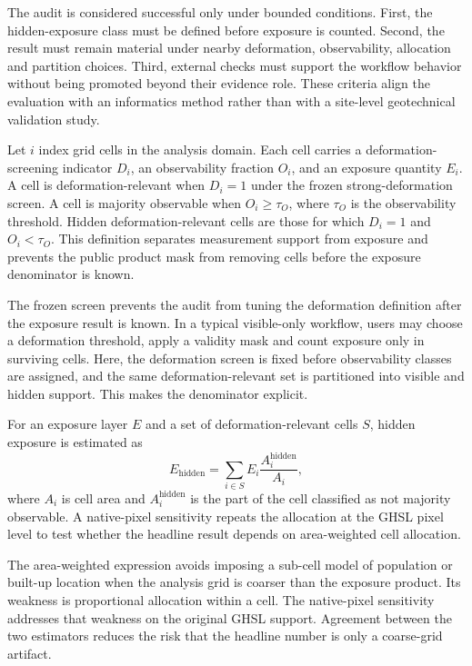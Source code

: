 \documentclass[pdflatex,sn-mathphys-ay]{sn-jnl}
\begin{document}
The audit is considered successful only under bounded conditions. First, the hidden-exposure class must be defined before exposure is counted. Second, the result must remain material under nearby deformation, observability, allocation and partition choices. Third, external checks must support the workflow behavior without being promoted beyond their evidence role. These criteria align the evaluation with an informatics method rather than with a site-level geotechnical validation study.

Let $i$ index grid cells in the analysis domain. Each cell carries a deformation-screening indicator $D_i$, an observability fraction $O_i$, and an exposure quantity $E_i$. A cell is deformation-relevant when $D_i=1$ under the frozen strong-deformation screen. A cell is majority observable when $O_i \geq \tau_O$, where $\tau_O$ is the observability threshold. Hidden deformation-relevant cells are those for which $D_i=1$ and $O_i<\tau_O$. This definition separates measurement support from exposure and prevents the public product mask from removing cells before the exposure denominator is known.

The frozen screen prevents the audit from tuning the deformation definition after the exposure result is known. In a typical visible-only workflow, users may choose a deformation threshold, apply a validity mask and count exposure only in surviving cells. Here, the deformation screen is fixed before observability classes are assigned, and the same deformation-relevant set is partitioned into visible and hidden support. This makes the denominator explicit.

For an exposure layer $E$ and a set of deformation-relevant cells $S$, hidden exposure is estimated as
\begin{equation}
E_{\mathrm{hidden}}=\sum_{i \in S} E_i \frac{A_i^{\mathrm{hidden}}}{A_i},
\end{equation}
where $A_i$ is cell area and $A_i^{\mathrm{hidden}}$ is the part of the cell classified as not majority observable. A native-pixel sensitivity repeats the allocation at the GHSL pixel level to test whether the headline result depends on area-weighted cell allocation.

The area-weighted expression avoids imposing a sub-cell model of population or built-up location when the analysis grid is coarser than the exposure product. Its weakness is proportional allocation within a cell. The native-pixel sensitivity addresses that weakness on the original GHSL support. Agreement between the two estimators reduces the risk that the headline number is only a coarse-grid artifact.
\end{document}
